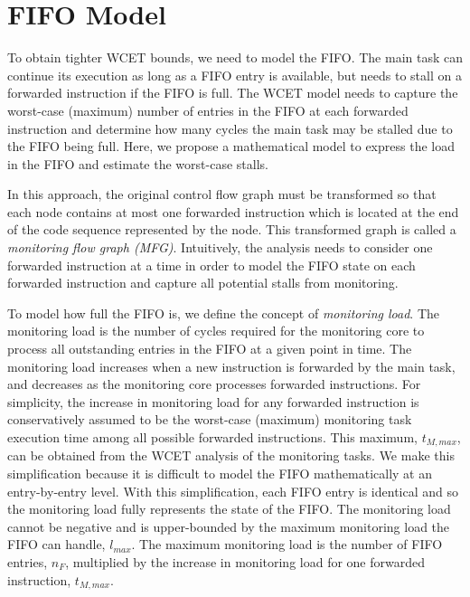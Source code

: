 \section{FIFO Model}
\label{sec:formulation:model}

To obtain tighter WCET bounds, we need to model the FIFO.
The main task can continue its execution as long as a
FIFO entry is available, but needs to stall on a forwarded instruction if
the FIFO is full. The WCET model needs to capture the worst-case (maximum)
number of entries in the FIFO at each forwarded instruction and determine
how many cycles the main task may be stalled due to the FIFO being full. Here,
we propose a mathematical model to express the load in the FIFO and estimate the worst-case stalls.


In this approach, the original control flow graph must be transformed so that 
each node contains at most one forwarded instruction which is located at the
end of the code sequence represented by the node.
This transformed graph is called a {\em monitoring flow graph (MFG)}.
Intuitively, the analysis needs to consider one forwarded instruction at a time
in order to model the FIFO state on each
forwarded instruction and capture all potential stalls from monitoring. 

To model how full the FIFO is, we define the concept of \emph{monitoring load}.
The monitoring load is the number of cycles required for the monitoring core 
to process all outstanding entries in the FIFO at a given point in time.
The monitoring load increases when a new instruction is 
forwarded by the main task, and decreases as the monitoring core processes
forwarded instructions.  For simplicity, the increase in monitoring load
for any forwarded instruction is conservatively assumed to be the worst-case (maximum) monitoring task
execution time among all possible forwarded instructions. This maximum, $t_{M, max}$, can be obtained from the WCET analysis of the monitoring tasks.
We make this simplification because it is difficult to model the FIFO
mathematically at an entry-by-entry level. With this simplification, each FIFO
entry is identical and so the monitoring load fully represents the state of the FIFO.
The monitoring load cannot be negative and is upper-bounded by the maximum
monitoring load the FIFO can handle, $l_{max}$.  The maximum monitoring load is
the number of FIFO entries, $n_F$, multiplied by the 
increase in monitoring load for one forwarded instruction, $t_{M, max}$.

